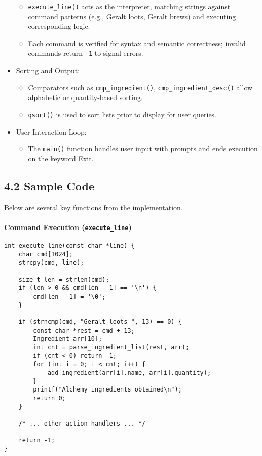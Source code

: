 \documentclass[12pt,a4paper]{article}
\begin{document}
\begin{itemize}
    \begin{itemize}
      \item \texttt{execute\_line()} acts as the interpreter, matching strings against command patterns (e.g., Geralt loots, Geralt brews) and executing corresponding logic.
      \item Each command is verified for syntax and semantic correctness; invalid commands return \texttt{-1} to signal errors.
    \end{itemize}
  \item Sorting and Output:
    \begin{itemize}
      \item Comparators such as \texttt{cmp\_ingredient()}, \texttt{cmp\_ingredient\_desc()} allow alphabetic or quantity-based sorting.
      \item \texttt{qsort()} is used to sort lists prior to display for user queries.
    \end{itemize}
  \item User Interaction Loop:
    \begin{itemize}
      \item The \texttt{main()} function handles user input with prompts and ends execution on the keyword Exit.
    \end{itemize}
\end{itemize}

\subsection{4.2 Sample Code}
Below are several key functions from the implementation.

\paragraph{Command Execution (\texttt{execute\_line})}
\begin{lstlisting}
int execute_line(const char *line) {
    char cmd[1024];
    strcpy(cmd, line);
    
    size_t len = strlen(cmd);
    if (len > 0 && cmd[len - 1] == '\n') {
        cmd[len - 1] = '\0';
    }

    if (strncmp(cmd, "Geralt loots ", 13) == 0) {
        const char *rest = cmd + 13;
        Ingredient arr[10];
        int cnt = parse_ingredient_list(rest, arr);
        if (cnt < 0) return -1;
        for (int i = 0; i < cnt; i++) {
            add_ingredient(arr[i].name, arr[i].quantity);
        }
        printf("Alchemy ingredients obtained\n");
        return 0;
    }

    /* ... other action handlers ... */

    return -1;
}
\end{lstlisting}
\end{document}

